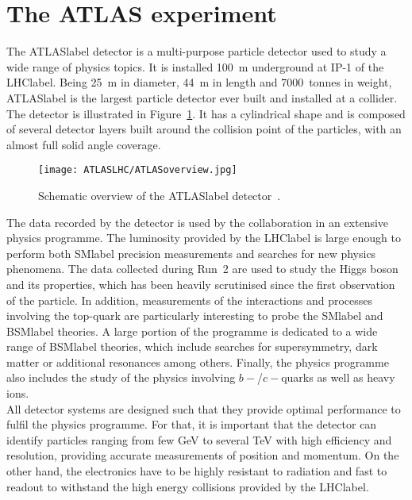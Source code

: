 \section{The ATLAS experiment}

The \acrshort{ATLASlabel} detector is a multi-purpose particle detector used to study a wide range of physics topics. It is installed 100~m underground at IP-1 of the \acrshort{LHClabel}. Being 25~m in diameter, 44~m in length and 7000~tonnes in weight, \acrshort{ATLASlabel} is the largest particle detector ever built and installed at a collider. The detector is illustrated in Figure~\ref{figLHC:ATLAS}. It has a cylindrical shape and is composed of several detector layers built around the collision point of the particles, with an almost full solid angle coverage.\\

\begin{figure}[htbp]
    \RawFloats
    \begin{center}
    \texttt{[image: ATLASLHC/ATLASoverview.jpg]}
    \caption{
        Schematic overview of the \acrshort{ATLASlabel} detector~\cite{Collaboration_2008}. 
    }
    \label{figLHC:ATLAS}
    \end{center}
\end{figure}

The data recorded by the detector is used by the collaboration in an extensive physics programme. The luminosity provided by the \acrshort{LHClabel} is large enough to perform both \acrshort{SMlabel} precision measurements and searches for new physics phenomena. The data collected during Run~2 are used to study the Higgs boson and its properties, which has been heavily scrutinised since the first observation of the particle. In addition, measurements of the interactions and processes involving the top-quark are particularly interesting to probe the \acrshort{SMlabel} and \acrshort{BSMlabel} theories. A large portion of the programme is dedicated to a wide range of \acrshort{BSMlabel} theories, which include searches for supersymmetry, dark matter or additional resonances among others. Finally, the physics programme also includes the study of the physics involving $b-$/$c-$quarks as well as heavy ions.\\

All detector systems are designed such that they provide optimal performance to fulfil the physics programme. For that, it is important that the detector can identify particles ranging from few GeV to several TeV with high efficiency and resolution, providing accurate measurements of position and momentum. On the other hand, the electronics have to be highly resistant to radiation and fast to readout to withstand the high energy collisions provided by the \acrshort{LHClabel}.\\

